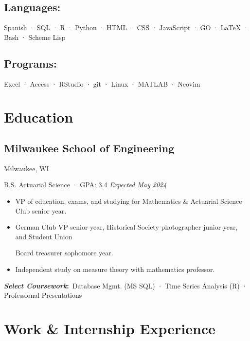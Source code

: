 \documentclass[12pt]{article}
\newcommand{\itemspace}{\vspace{0.1870em}}
\renewcommand{\textsc}[1]{\uppercase{\footnotesize#1}\normalsize}
\begin{document}
\subsection{Languages:} \:
Spanish · \textsc{sql} · \textsc{r} · Python · \textsc{html} · \textsc{css} ·
JavaScript · \textsc{go} · \LaTeX{} · Bash · Scheme Lisp

\subsection{Programs:} \:
Excel · Access · RStudio · git ·  Linux · \textsc{MATLAB} · Neovim

\itemspace

\section{Education}

\subsection{Milwaukee School of Engineering} \hfill Milwaukee, WI

B.S. Actuarial Science · GPA: 3.4 \hfill \textit{Expected May 2024}

\begin{itemize}[noitemsep,nolistsep]
  \item VP of education, exams, and studying for Mathematics \& Actuarial
    Science Club senior year.

  \item German Club VP senior year, Historical Society photographer junior
    year, and Student Union

    Board treasurer sophomore year.

  \item Independent study on measure theory with mathematics professor.
\end{itemize}

\textbf{\textit{Select Coursework}:} \,Database Mgmt. (\textsc{ms sql}) ·
Time Series Analysis (\textsc{R}) · Professional Presentations

\itemspace

\section{Work \& Internship Experience}
\end{document}
